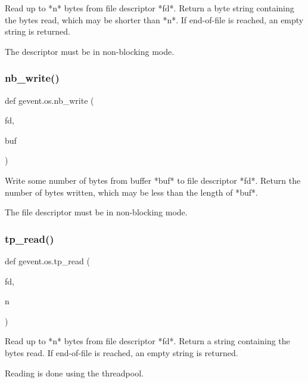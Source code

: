 \begin{DoxyVerb}Read up to *n* bytes from file descriptor *fd*. Return a
byte string containing the bytes read, which may be shorter than
*n*. If end-of-file is reached, an empty string is returned.

The descriptor must be in non-blocking mode.
\end{DoxyVerb}
 \mbox{\label{namespacegevent_1_1os_a22d656b3256c18d0db846822e129eafb}} 
\subsubsection{\texorpdfstring{nb\+\_\+write()}{nb\_write()}}
{\footnotesize\ttfamily def gevent.\+os.\+nb\+\_\+write (\begin{DoxyParamCaption}\item[{}]{fd,  }\item[{}]{buf }\end{DoxyParamCaption})}

\begin{DoxyVerb}Write some number of bytes from buffer *buf* to file
descriptor *fd*. Return the number of bytes written, which may
be less than the length of *buf*.

The file descriptor must be in non-blocking mode.
\end{DoxyVerb}
 \mbox{\label{namespacegevent_1_1os_a49ed3c20a04f75267ee2fe251c4358a9}} 
\subsubsection{\texorpdfstring{tp\+\_\+read()}{tp\_read()}}
{\footnotesize\ttfamily def gevent.\+os.\+tp\+\_\+read (\begin{DoxyParamCaption}\item[{}]{fd,  }\item[{}]{n }\end{DoxyParamCaption})}

\begin{DoxyVerb}Read up to *n* bytes from file descriptor *fd*. Return a string
containing the bytes read. If end-of-file is reached, an empty string
is returned.

Reading is done using the threadpool.
\end{DoxyVerb}
 \mbox{\label{namespacegevent_1_1os_abda169fc047bb4cc04b25ea8f154aa7f}} 
